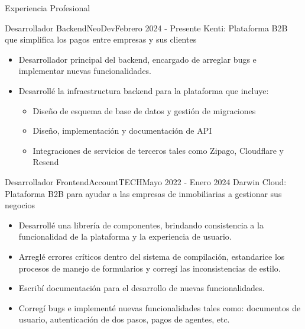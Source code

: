 \documentclass[]{mcdowell-cv/mcdowellcv}
\begin{document}
    \makeheader

    \begin{cvsection}{Experiencia Profesional}
        \begin{cvsubsection}{Desarrollador Backend}{NeoDev}{Febrero 2024 - Presente}
            Kenti: Plataforma B2B que simplifica los pagos entre empresas y sus clientes
            \begin{itemize}
                \item Desarrollador principal del backend, encargado de arreglar bugs e implementar nuevas funcionalidades.
                \item Desarrollé la infraestructura backend para la plataforma que incluye:
                \begin {itemize}
                    \item Diseño de esquema de base de datos y gestión de migraciones
                    \item Diseño, implementación y documentación de API
                    \item Integraciones de servicios de terceros tales como Zipago, Cloudflare y Resend
                \end{itemize}
            \end{itemize}
        \end{cvsubsection}

        \begin{cvsubsection}{Desarrollador Frontend}{AccountTECH}{Mayo 2022 - Enero 2024}
            Darwin Cloud: Plataforma B2B para ayudar a las empresas de inmobiliarias a gestionar sus negocios
            \begin{itemize}
                \item Desarrollé una librería de componentes, brindando consistencia a la funcionalidad de la plataforma y la experiencia de usuario.
                \item Arreglé errores críticos dentro del sistema de compilación, estandarice los procesos de manejo de formularios y corregí las inconsistencias de estilo.
                \item Escribí documentación para el desarrollo de nuevas funcionalidades.
                \item Corregí bugs e implementé nuevas funcionalidades tales como: documentos de usuario, autenticación de dos pasos, pagos de agentes, etc.
            \end{itemize}
        \end{cvsubsection}


\end{cvsection}
\end{document}
